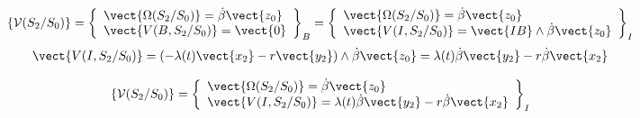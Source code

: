 \ifprof
\begin{corrige}
$$\{\mathcal{V}(S_2/S_0)\} = 
\left\{
\begin{array}{l}
\vect{\Omega(S_2/S_0)} = \dot{\beta}\vect{z_0} \\
\vect{V(B,S_2/S_0)} = \vect{0}
\end{array}
\right\}_B =
\left\{
\begin{array}{l}
\vect{\Omega(S_2/S_0)} = \dot{\beta}\vect{z_0} \\
\vect{V(I,S_2/S_0)} = \vect{IB} \wedge \dot{\beta}\vect{z_0}
\end{array}
\right\}_I
$$
$$
\vect{V(I,S_2/S_0)} =\left( -\lambda(t)\vect{x_2} - r \vect{y_2} \right) \wedge \dot{\beta}\vect{z_0} = \lambda(t) \dot{\beta}\vect{y_2} - r\dot{\beta}\vect{x_2}
$$

$$\{\mathcal{V}(S_2/S_0)\} = 
\left\{
\begin{array}{l}
\vect{\Omega(S_2/S_0)} = \dot{\beta}\vect{z_0} \\
\vect{V(I,S_2/S_0)} = \lambda(t) \dot{\beta}\vect{y_2} - r\dot{\beta}\vect{x_2}
\end{array}
\right\}_I
$$

\end{corrige}
\else\fi

